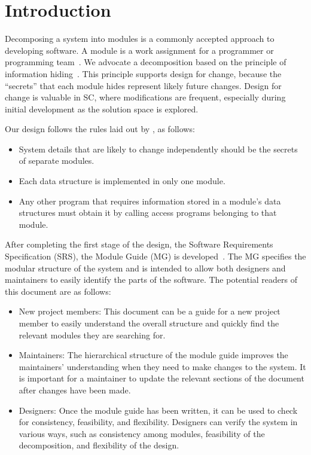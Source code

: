 \documentclass[12pt, titlepage]{article}
\begin{document}
\listoffigures

\newpage


\section{Introduction}

Decomposing a system into modules is a commonly accepted approach to developing
software. A module is a work assignment for a programmer or programming
team~\citep{ParnasEtAl1984}. We advocate a decomposition based on the principle
of information hiding~\citep{Parnas1972a}. This principle supports design for
change, because the ``secrets'' that each module hides represent likely future
changes. Design for change is valuable in SC, where modifications are frequent,
especially during initial development as the solution space is explored.

Our design follows the rules laid out by \citet{ParnasEtAl1984}, as follows:
\begin{itemize}
\item System details that are likely to change independently should be the
  secrets of separate modules.
\item Each data structure is implemented in only one module.
\item Any other program that requires information stored in a module's data
  structures must obtain it by calling access programs belonging to that
  module.
\end{itemize}

After completing the first stage of the design, the Software Requirements
Specification (SRS), the Module Guide (MG) is developed~\citep{ParnasEtAl1984}.
The MG specifies the modular structure of the system and is intended to allow
both designers and maintainers to easily identify the parts of the software.
The potential readers of this document are as follows:

\begin{itemize}
\item New project members: This document can be a guide for a new project member
  to easily understand the overall structure and quickly find the relevant
  modules they are searching for.
\item Maintainers: The hierarchical structure of the module guide improves the
  maintainers' understanding when they need to make changes to the system. It
  is important for a maintainer to update the relevant sections of the document
  after changes have been made.
\item Designers: Once the module guide has been written, it can be used to
  check for consistency, feasibility, and flexibility. Designers can verify
  the system in various ways, such as consistency among modules, feasibility
  of the decomposition, and flexibility of the design.
\end{itemize}
\end{document}
